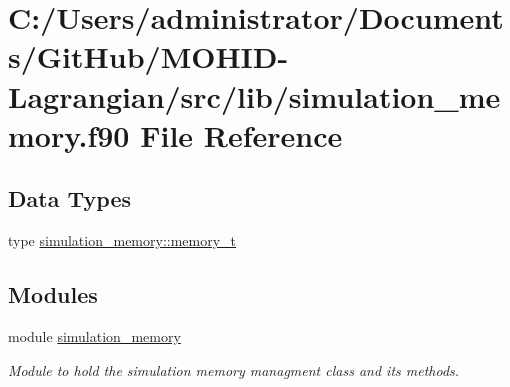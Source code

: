 \hypertarget{simulation__memory_8f90}{}\section{C\+:/\+Users/administrator/\+Documents/\+Git\+Hub/\+M\+O\+H\+I\+D-\/\+Lagrangian/src/lib/simulation\+\_\+memory.f90 File Reference}
\label{simulation__memory_8f90}
\subsection*{Data Types}
\begin{DoxyCompactItemize}
\item 
type \mbox{\hyperlink{structsimulation__memory_1_1memory__t}{simulation\+\_\+memory\+::memory\+\_\+t}}
\end{DoxyCompactItemize}
\subsection*{Modules}
\begin{DoxyCompactItemize}
\item 
module \mbox{\hyperlink{namespacesimulation__memory}{simulation\+\_\+memory}}
\begin{DoxyCompactList}\small\item\em Module to hold the simulation memory managment class and its methods. \end{DoxyCompactList}\end{DoxyCompactItemize}
